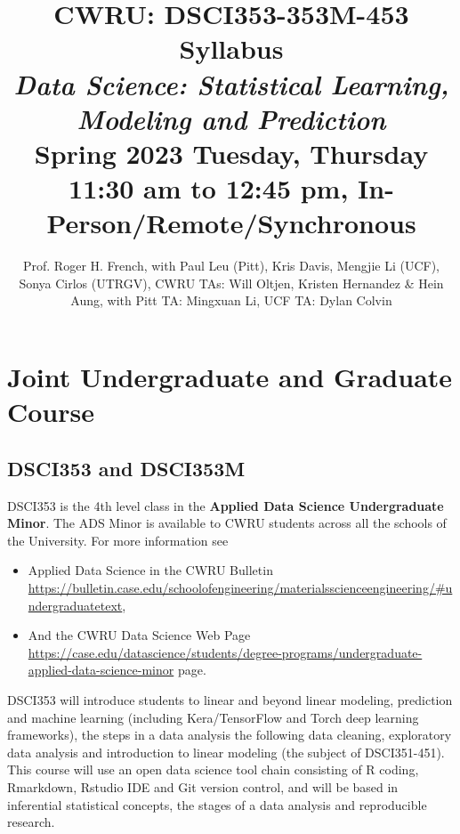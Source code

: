 \documentclass[10pt]{article} %
\title{CWRU: DSCI353-353M-453 Syllabus \\ \emph{Data Science: Statistical Learning, Modeling and Prediction} \\ Spring 2023 	Tuesday, Thursday 11:30 am to 12:45 pm, In-Person/Remote/Synchronous}
\author{Prof. Roger H. French, with Paul Leu (Pitt), Kris Davis, Mengjie Li (UCF), Sonya Cirlos (UTRGV), CWRU TAs: Will Oltjen, Kristen Hernandez \& Hein Aung, with Pitt TA: Mingxuan Li, UCF TA: Dylan Colvin}
\begin{document}
\maketitle


\section{Joint Undergraduate and Graduate Course}

  \subsection{DSCI353 and DSCI353M}

    DSCI353 is the 4th level class in the \textbf{Applied Data Science Undergraduate Minor}.
    The ADS Minor is available to CWRU students across all the schools of the University.
    For more information see

    \begin{itemize}
      \item Applied Data Science in the CWRU Bulletin
        \subitem \href{https://bulletin.case.edu/schoolofengineering/materialsscienceengineering/#undergraduatetext}{https://bulletin.case.edu/schoolofengineering/materialsscienceengineering/\#undergraduatetext},
       \item And the CWRU Data Science Web Page
       \subitem \href{https://case.edu/datascience/students/degree-programs/undergraduate-applied-data-science-minor}{https://case.edu/datascience/students/degree-programs/undergraduate-applied-data-science-minor} page.
    \end{itemize}

    DSCI353 will introduce students to linear and beyond linear modeling, prediction and machine learning (including Kera/TensorFlow and Torch deep learning frameworks), the steps in a data analysis the following data cleaning, exploratory data analysis and introduction to linear modeling (the subject of DSCI351-451).
    This course will use an open data science tool chain consisting of R coding, Rmarkdown, Rstudio IDE and Git version control, and will be based in inferential statistical concepts, the stages of a data analysis and reproducible research.
\end{document}
